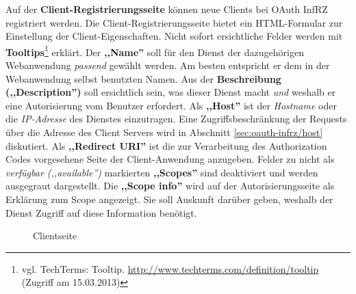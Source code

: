 \documentclass[12pt,a4paper,pointednumbers,abstracton]{scrartcl}
\begin{document}
Auf der \textbf{Client-Registrierungsseite} können neue Clients bei OAuth InfRZ registriert werden.
Die Client-Registrierungsseite bietet ein HTML-Formular zur Einstellung der Client-Eigenschaften.
Nicht sofort ersichtliche Felder werden mit \textbf{Tooltips}\footnote{vgl. TechTerms: Tooltip. \url{http://www.techterms.com/definition/tooltip} (Zugriff am 15.03.2013)} erklärt.
Der \textbf{,,Name''} soll für den Dienst der dazugehörigen Webanwendung \emph{passend} gewählt werden.
Am besten entspricht er dem in der Webanwendung selbst benutzten Namen.
Aus der \textbf{Beschreibung (,,Description'')} soll ersichtlich sein, was dieser Dienst macht \emph{und} weshalb er eine Autorisierung vom Benutzer erfordert.
Als \textbf{,,Host''} ist der \emph{Hostname} oder die \emph{IP-Adresse} des Dienstes einzutragen.
Eine Zugriffsbeschränkung der Requests über die Adresse des Client Servers wird in Abschnitt \ref{sec:oauth-infrz/host} diskutiert.
Als \textbf{,,Redirect URI''} ist die zur Verarbeitung des Authorization Codes vorgesehene Seite der Client-Anwendung anzugeben.
Felder zu nicht als \emph{verfügbar (,,available'')} markierten \textbf{,,Scopes''} sind deaktiviert und werden ausgegraut dargestellt.
Die \textbf{,,Scope info''} wird auf der Autorisierungsseite als Erklärung zum Scope angezeigt.
Sie soll Auskunft darüber geben, weshalb der Dienst Zugriff auf diese Information benötigt.

\begin{figure}[h!]
\centering
{}
\caption{Clientseite}
\label{pic:oauth_infrz/client}
\end{figure}
\end{document}
